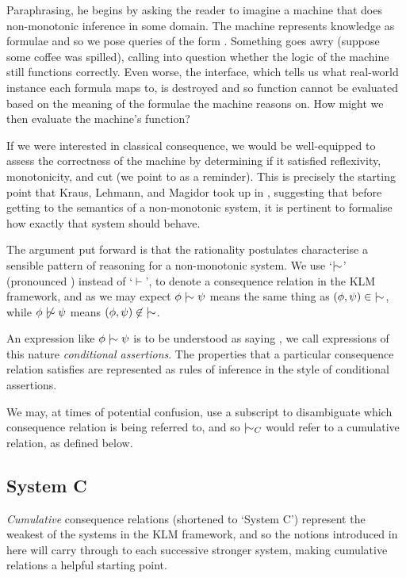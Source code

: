 Paraphrasing, he begins by asking the reader to imagine a machine that does non-monotonic inference in some domain. The machine represents knowledge as formulae and so we pose queries of the form .
Something goes awry (suppose some coffee was spilled), calling into question whether the logic of the machine still functions correctly. Even worse, the interface, which tells us what real-world instance
each formula maps to, is destroyed and so function cannot be evaluated based on the meaning of the formulae the machine reasons on. How might we then evaluate the machine's function?

If we were interested in classical consequence, we would be well-equipped to assess the correctness of the machine by determining if it satisfied reflexivity, monotonicity, and cut (we point to 
as a reminder). This is precisely the starting point that Kraus, Lehmann, and Magidor took up in \cite{kraus1990nonmonotonic}, suggesting that before getting to the semantics of a non-monotonic system,
it is pertinent to formalise how exactly that system should behave.

The argument put forward is that the rationality postulates characterise a sensible pattern of reasoning for a non-monotonic system. We use `$\twiddle$' (pronounced ) instead of `$\vdash$',
to denote a consequence relation in the KLM framework, and as we may expect $\phi \twiddle \psi$ means the same thing as $(\phi, \psi) \in \; \twiddle$, while $\phi \ntwiddle \psi$ means
$(\phi, \psi ) \not \in \; \twiddle$.

An expression like $\phi \twiddle \psi$ is to be understood as saying , we call expressions of this nature \textit{conditional assertions}.
The properties that a particular consequence relation satisfies are represented as rules of inference in the style of conditional assertions.

We may, at times of potential confusion, use a subscript to disambiguate which consequence relation is being referred to, and so $\twiddle_{C}$ would refer to a cumulative relation, as defined below.

\subsection{System C}
\label{subsection:system-c} \textit{Cumulative} consequence relations (shortened to `System C') \cite{kraus1990nonmonotonic} represent the weakest of the systems in the KLM framework, and so the
notions introduced in here will carry through to each successive stronger system, making cumulative relations a helpful starting point.

